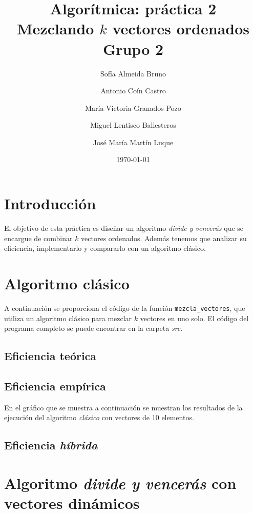 \documentclass[11pt]{article}
\title{Algorítmica: práctica 2 \\ \large Mezclando $k$ vectores ordenados\\ \vspace{0.2em}Grupo 2}
\author{Sofía Almeida Bruno \and Antonio Coín Castro \and María Victoria Granados Pozo \and Miguel Lentisco Ballesteros \and José María Martín Luque}
\date{\today}
\begin{document}
\maketitle

\newpage

\section*{Introducción}

El objetivo de esta práctica es diseñar un algoritmo \textit{divide y vencerás}
que se encargue de combinar $k$ vectores ordenados. Además tenemos que analizar
su eficiencia, implementarlo y compararlo con un algoritmo clásico.

\section*{Algoritmo clásico}

A continuación se proporciona el código de la función \texttt{mezcla\_vectores},
que utiliza un algoritmo clásico para mezclar $k$ vectores en uno solo. El
código del programa completo se puede encontrar en la carpeta \textit{src}.



\subsection*{Eficiencia teórica}

\subsection*{Eficiencia empírica}

En el gráfico que se muestra a continuación se muestran los resultados de la
ejecución del algoritmo \textit{clásico} con vectores de 10 elementos.

\begin{center}
	
\end{center}

\subsection*{Eficiencia \textit{híbrida}}

\section*{Algoritmo \textit{divide y vencerás} con vectores dinámicos}
\end{document}
